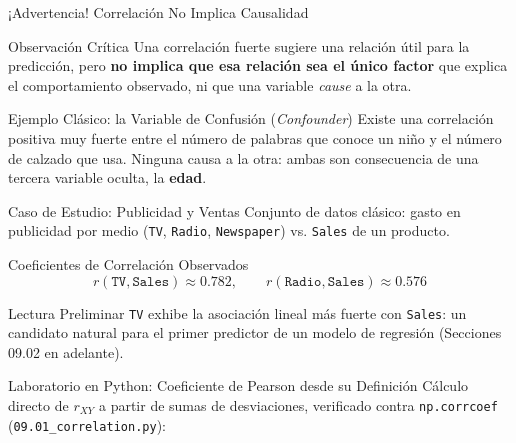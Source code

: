 \documentclass[10pt, aspectratio=169]{beamer}
\begin{document}
\begin{frame}{¡Advertencia! Correlación No Implica Causalidad}
  \footnotesize
  \begin{alertblock}{Observación Crítica}
    Una correlación fuerte sugiere una relación útil para la predicción, pero \textbf{no implica que esa relación sea el único factor} que explica el comportamiento observado, ni que una variable \emph{cause} a la otra.
  \end{alertblock}
  \pause

  \vspace{0.1cm}
  \begin{block}{Ejemplo Clásico: la Variable de Confusión (\emph{Confounder})}
    Existe una correlación positiva muy fuerte entre el número de palabras que conoce un niño y el número de calzado que usa. Ninguna causa a la otra: ambas son consecuencia de una tercera variable oculta, la \textbf{edad}.
  \end{block}
\end{frame}

\begin{frame}{Caso de Estudio: Publicidad y Ventas}
  \footnotesize
  Conjunto de datos clásico: gasto en publicidad por medio (\texttt{TV}, \texttt{Radio}, \texttt{Newspaper}) vs. \texttt{Sales} de un producto.
  \pause

  \vspace{0.1cm}
  \begin{block}{Coeficientes de Correlación Observados}
    $$r(\texttt{TV},\texttt{Sales})\approx0.782, \qquad r(\texttt{Radio},\texttt{Sales})\approx0.576$$
  \end{block}
  \pause

  \vspace{0.1cm}
  \begin{alertblock}{Lectura Preliminar}
    \texttt{TV} exhibe la asociación lineal más fuerte con \texttt{Sales}: un candidato natural para el primer predictor de un modelo de regresión (Secciones 09.02 en adelante).
  \end{alertblock}
\end{frame}

\begin{frame}[fragile]{Laboratorio en Python: Coeficiente de Pearson desde su Definición}
  \scriptsize
  Cálculo directo de $r_{XY}$ a partir de sumas de desviaciones, verificado contra \texttt{np.corrcoef} (\texttt{09.01\_correlation.py}):
  {
  }
\end{frame}
\end{document}
